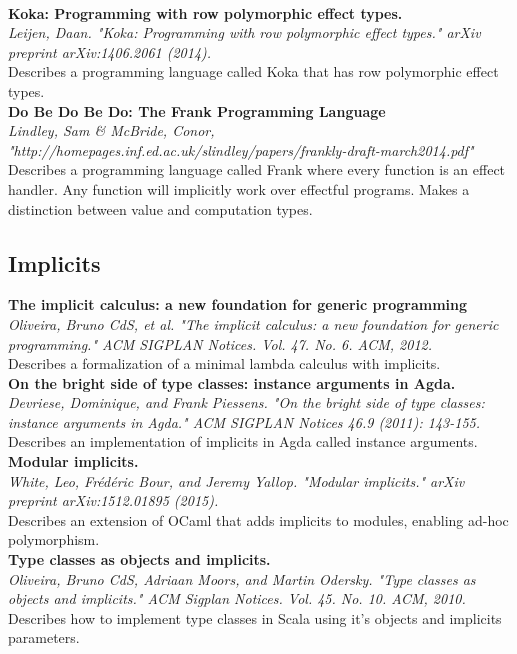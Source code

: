 \documentclass[12pt]{article}
\begin{document}
\\
\textbf{Koka: Programming with row polymorphic effect types.} \\
\textit{Leijen, Daan. "Koka: Programming with row polymorphic effect types." arXiv preprint arXiv:1406.2061 (2014).} \\
Describes a programming language called Koka that has row polymorphic effect types.
\\
\textbf{Do Be Do Be Do: The Frank Programming Language} \\
\textit{Lindley, Sam \& McBride, Conor, "http://homepages.inf.ed.ac.uk/slindley/papers/frankly-draft-march2014.pdf"} \\
Describes a programming language called Frank where every function is an effect handler. Any function will implicitly work over effectful programs.
Makes a distinction between value and computation types.

\subsection{Implicits}
\textbf{The implicit calculus: a new foundation for generic programming} \\
\textit{Oliveira, Bruno CdS, et al. "The implicit calculus: a new foundation for generic programming." ACM SIGPLAN Notices. Vol. 47. No. 6. ACM, 2012.} \\
Describes a formalization of a minimal lambda calculus with implicits.
\\
\textbf{On the bright side of type classes: instance arguments in Agda.} \\
\textit{Devriese, Dominique, and Frank Piessens. "On the bright side of type classes: instance arguments in Agda." ACM SIGPLAN Notices 46.9 (2011): 143-155.} \\
Describes an implementation of implicits in Agda called instance arguments.
\\
\textbf{Modular implicits.} \\
\textit{White, Leo, Frédéric Bour, and Jeremy Yallop. "Modular implicits." arXiv preprint arXiv:1512.01895 (2015).} \\
Describes an extension of OCaml that adds implicits to modules, enabling ad-hoc polymorphism. 
\\
\textbf{Type classes as objects and implicits.} \\
\textit{Oliveira, Bruno CdS, Adriaan Moors, and Martin Odersky. "Type classes as objects and implicits." ACM Sigplan Notices. Vol. 45. No. 10. ACM, 2010.} \\
Describes how to implement type classes in Scala using it's objects and implicits parameters.
\end{document}
